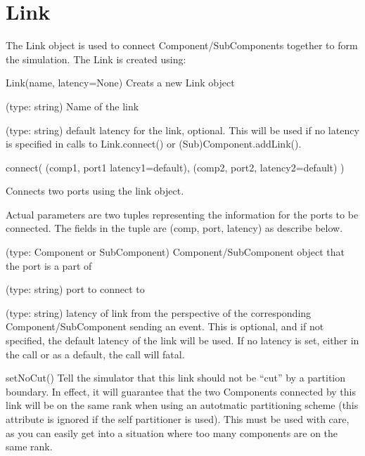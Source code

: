 \section{Link}

The Link object is used to connect Component/SubComponents together to
form the simulation.  The Link is created using:

\begin{functiondoc}{Link(name, latency=None)}{
    Creats a new Link object
}

   (type: string) Name of the link

   (type: string) default latency for the link,
  optional.  This will be used if no latency is specified in calls to
  Link.connect() or (Sub)Component.addLink().


\end{functiondoc}


\begin{functiondoc}{connect( (comp1, port1 latency1=default), (comp2, port2, latency2=default) )}{

    Connects two ports using the link object.

    Actual parameters are two tuples representing the information for
    the ports to be connected.  The fields in the tuple are (comp,
    port, latency) as describe below.

}

   (type: Component or SubComponent)
  Component/SubComponent object that the port is a part of

   (type: string) port to connect to

   (type: string) latency of link from the perspective
  of the corresponding Component/SubComponent sending an event.  This
  is optional, and if not specified, the default latency of the link
  will be used.  If no latency is set, either in the call or as a
  default, the call will fatal.

  \noreturn

\end{functiondoc}


\begin{functiondoc}{setNoCut()}{
    Tell the simulator that this link should not be “cut” by a
    partition boundary.  In effect, it will guarantee that the two
    Components connected by this link will be on the same rank when
    using an autotmatic partitioning scheme (this attribute is ignored
    if the self partitioner is used).  This must be used with care, as
    you can easily get into a situation where too many components are
    on the same rank.  }

  \noreturn
\end{functiondoc}
